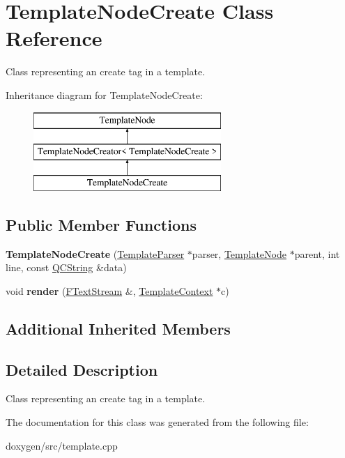 \hypertarget{class_template_node_create}{}\section{Template\+Node\+Create Class Reference}
\label{class_template_node_create}


Class representing an \textquotesingle{}create\textquotesingle{} tag in a template.  


Inheritance diagram for Template\+Node\+Create\+:\begin{figure}[H]
\begin{center}
\leavevmode
\includegraphics[height=3.000000cm]{class_template_node_create}
\end{center}
\end{figure}
\subsection*{Public Member Functions}
\begin{DoxyCompactItemize}
\item 
\mbox{\label{class_template_node_create_aaff38b23cc47e0e70fdf5aebe2bbf7c0}} 
{\bfseries Template\+Node\+Create} (\mbox{\hyperlink{class_template_parser}{Template\+Parser}} $\ast$parser, \mbox{\hyperlink{class_template_node}{Template\+Node}} $\ast$parent, int line, const \mbox{\hyperlink{class_q_c_string}{Q\+C\+String}} \&data)
\item 
\mbox{\label{class_template_node_create_a9d45855984c41d86b4554576bcda9d51}} 
void {\bfseries render} (\mbox{\hyperlink{class_f_text_stream}{F\+Text\+Stream}} \&, \mbox{\hyperlink{class_template_context}{Template\+Context}} $\ast$c)
\end{DoxyCompactItemize}
\subsection*{Additional Inherited Members}


\subsection{Detailed Description}
Class representing an \textquotesingle{}create\textquotesingle{} tag in a template. 

The documentation for this class was generated from the following file\+:\begin{DoxyCompactItemize}
\item 
doxygen/src/template.\+cpp\end{DoxyCompactItemize}
